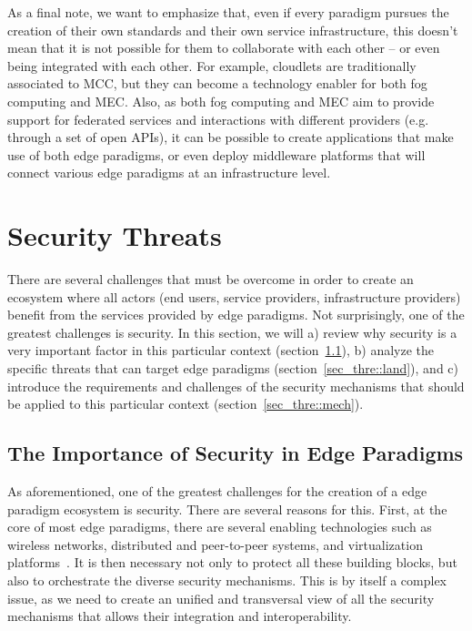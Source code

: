 \documentclass[twocolumn,preprint,3p]{elsarticle}
\begin{document}
As a final note, we want to emphasize that, even if every paradigm pursues the creation of their own standards and their own service infrastructure, this doesn't mean that it is not possible for them to collaborate with each other -- or even being integrated with each other. For example, cloudlets are traditionally associated to MCC, but they can become a technology enabler for both fog computing and MEC. Also, as both fog computing and MEC aim to provide support for federated services and interactions with different providers (e.g. through a set of open APIs), it can be possible to create applications that make use of both edge paradigms, or even deploy middleware platforms that will connect various edge paradigms at an infrastructure level.



\section{Security Threats}
\label{sec_thre}

There are several challenges that must be overcome in order to create an ecosystem where all actors (end users, service providers, infrastructure providers) benefit from the services provided by edge paradigms. Not surprisingly, one of the greatest challenges is security. In this section, we will a) review why security is a very important factor in this particular context (section~\ref{sec_thre::whysec}), b) analyze the specific threats that can target edge paradigms (section~\ref{sec_thre::land}), and c) introduce the requirements and challenges of the security mechanisms that should be applied to this particular context (section~\ref{sec_thre::mech}).

\subsection{The Importance of Security in Edge Paradigms}
\label{sec_thre::whysec}

As aforementioned, one of the greatest challenges for the creation of a edge paradigm ecosystem is security. There are several reasons for this. First, at the core of most edge paradigms, there are several enabling technologies such as wireless networks, distributed and peer-to-peer systems, and virtualization platforms~\cite{Vaquero14}. It is then necessary not only to protect all these building blocks, but also to orchestrate the diverse security mechanisms. This is by itself a complex issue, as we need to create an unified and transversal view of all the security mechanisms that allows their integration and interoperability.
\end{document}
